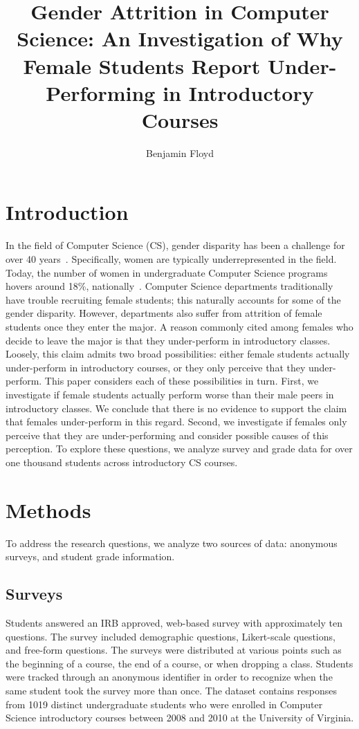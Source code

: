 \documentclass[a4paper,man,natbib]{apa6}
\title{Gender Attrition in Computer Science: An Investigation of Why Female Students Report Under-Performing in Introductory Courses}
\author{Benjamin Floyd}
\affiliation{University of Virginia}
\begin{document}
\maketitle

\section{Introduction}
\label{sec:intro}
In the field of Computer Science (CS), gender disparity has been a challenge
for over 40 years~\citep{Dale-studentprofile, Camp, Cohoon-retention,
Frenkel-women, Klawe-increasingpaarticipation, Montanelli-women,
Spertus-whysofew}. Specifically, women are typically underrepresented in the
field. Today, the number of women in undergraduate Computer Science programs
hovers around 18\%, nationally~\citep{womenincs-DOE}. Computer Science departments
traditionally have trouble recruiting female students; this naturally accounts
for some of the gender disparity. However, departments also suffer from
attrition of female students once they enter the major. A reason commonly cited
among females who decide to leave the major is that they under-perform in
introductory classes.  Loosely, this claim admits two broad possibilities:
either female students actually under-perform in introductory courses, or they
only perceive that they under-perform. This paper considers each of these
possibilities in turn. First, we investigate if female students actually
perform worse than their male peers in introductory classes. We conclude that
there is no evidence to support the claim that females under-perform in this
regard. Second, we investigate if females only perceive that they are
under-performing and consider possible causes of this perception.  To explore
these questions, we analyze survey and grade data for over one thousand
students across introductory CS courses.

\section{Methods}
\label{sec:methods}
To address the research questions, we analyze two sources of data: anonymous
surveys, and student grade information. 

\subsection{Surveys}
\label{sec:survey}
Students answered an IRB approved, web-based survey with approximately ten
questions. The survey included demographic questions, Likert-scale questions,
and free-form questions. The surveys were distributed at various points such as the
beginning of a course, the end of a course, or when dropping a class. Students
were tracked through an anonymous identifier in order to recognize when the
same student took the survey more than once. The dataset contains responses
from 1019 distinct undergraduate students who were enrolled in Computer Science
introductory courses between 2008 and 2010 at the University of Virginia.
\end{document}
